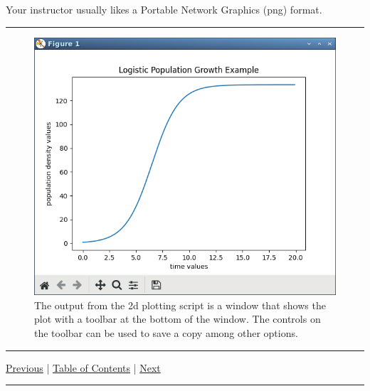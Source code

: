 \documentclass[10pt,fleqn]{article}
\begin{document}
Your instructor usually likes a Portable Network Graphics (png) format. 
\vskip0.1in\hrule\vskip0.1in
\vfill
\begin{figure}[h]
\centering
\includegraphics[width=6.0in]{../images/2dplot_06.png}
\caption{The output from the 2d plotting script is a window that shows the plot
         with a toolbar at the bottom of the window. The controls on the
         toolbar can be used to save a copy among other options.}
\end{figure}
\eject
\vskip0.1in\hrule\vskip0.1in \noindent
  \href{../../topic_09/md/topic_09.md}{Previous} |
  \href{../../toc/md/topic_toc.md}{Table of Contents} |
  \href{../../topic_11/md/topic_11.md}{Next}
\vskip0.1in\hrule\vskip0.1in \noindent
\end{document}
